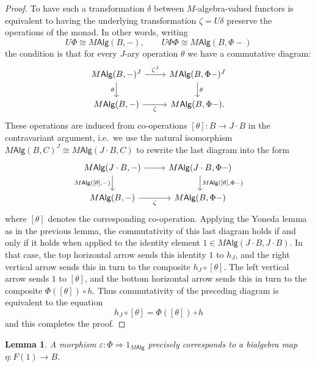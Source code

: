 \documentclass[12pt,reqno]{amsart}
\theoremstyle{plain}
\newtheorem{lem}[thm]{Lemma}
\theoremstyle{definition}
\theoremstyle{remark}
\newcommand{\maps}{\colon}
\newcommand{\To}{\Rightarrow}
\newcommand{\namedcat}[1]{\mathsf{#1}}
\newcommand{\Alg}{\namedcat{Alg}}
\numberwithin{thm}{section}
\begin{document}
\begin{proof}
    To have such a transformation $\delta$ between $M$-algebra-valued functors is equivalent to having the underlying transformation $\zeta = U\delta$ preserve the operations of the monad. In other words, writing 
    \[
        U\Phi \cong M\Alg(B, -), \qquad U\Phi\Phi \cong M\Alg(B, \Phi -) 
    \]
    the condition is that for every $J$-ary operation $\theta$ we have a commutative diagram: 
    \[
    \begin{tikzcd}
         M\Alg(B, -)^J 
         \arrow[r, "\zeta^J"] 
         \arrow[swap, d, "\theta"] 
         & 
         M\Alg(B, \Phi -)^J 
         \arrow[d, "\theta"] 
         \\ 
         M\Alg(B, -) 
         \arrow[r, "\zeta", swap] 
         & 
         M\Alg(B, \Phi -).
    \end{tikzcd}
    \]
    These operations are induced from co-operations $[\theta] \maps B \to J \cdot B$ in the contravariant argument, i.e.\ we use the natural isomorphism $M\Alg(B, C)^J \cong M\Alg(J \cdot B, C)$ to rewrite the last diagram into the form 
    \[
    \begin{tikzcd}
        M\Alg(J \cdot B, -) 
        \arrow[r] 
        \arrow[swap, d, "{M\Alg(\lbrack\theta\rbrack, -)}"] 
        & 
        M\Alg(J \cdot B, \Phi -) 
        \arrow[d, "{M\Alg(\lbrack\theta\rbrack, \Phi -)}"] 
        \\ 
        M\Alg(B, -) 
        \arrow[r, "\zeta", swap] 
        & 
        M\Alg(B, \Phi -) 
    \end{tikzcd}
    \]
    where $[\theta]$ denotes the corresponding co-operation. Applying the Yoneda lemma as in the previous lemma, the commutativity of this last diagram holds if and only if it holds when applied to the identity element $1 \in M\Alg(J \cdot B, J \cdot B)$. In that case, the top horizontal arrow sends this identity $1$ to $h_J$, and the right vertical arrow sends this in turn to the composite $h_J \circ [\theta]$. The left vertical arrow sends $1$ to $[\theta]$, and the bottom horizontal arrow sends this in turn to the composite $\Phi([\theta]) \circ h$. Thus commutativity of the preceding diagram is equivalent to the equation 
    \[
        h_J \circ [\theta] = \Phi([\theta]) \circ h
    \]
    and this completes the proof. 
\end{proof} 

\begin{lem}
\label{lem:M-plethory_counit}
    A morphism $\varepsilon \maps \Phi \To 1_{M\Alg}$ precisely corresponds to a bialgebra map $\eta \maps F(1) \to B$. 
\end{lem}
\end{document}
